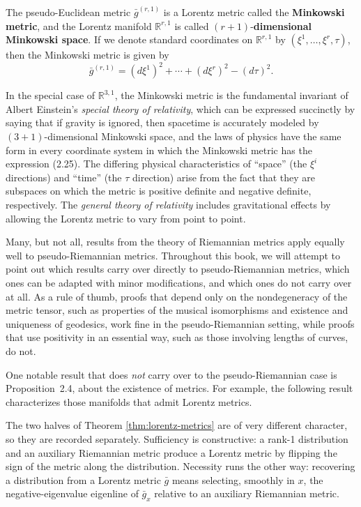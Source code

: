 The pseudo-Euclidean metric $\bar{g}^{(r,1)}$ is a Lorentz metric called the \textbf{Minkowski metric}, and the Lorentz manifold $\mathbb{R}^{r,1}$ is called $(r+1)$-\textbf{dimensional Minkowski space}. If we denote standard coordinates on $\mathbb{R}^{r,1}$ by $(\xi^1, \ldots, \xi^r, \tau)$, then the Minkowski metric is given by
\begin{equation}
\bar{g}^{(r,1)} = (d\xi^1)^2 + \cdots + (d\xi^r)^2 - (d\tau)^2.
\tag{2.25}
\end{equation}

In the special case of $\mathbb{R}^{3,1}$, the Minkowski metric is the fundamental invariant of Albert Einstein's \textit{special theory of relativity}, which can be expressed succinctly by saying that if gravity is ignored, then spacetime is accurately modeled by $(3+1)$-dimensional Minkowski space, and the laws of physics have the same form in every coordinate system in which the Minkowski metric has the expression (2.25). The differing physical characteristics of ``space'' (the $\xi^i$ directions) and ``time'' (the $\tau$ direction) arise from the fact that they are subspaces on which the metric is positive definite and negative definite, respectively. The \textit{general theory of relativity} includes gravitational effects by allowing the Lorentz metric to vary from point to point.

Many, but not all, results from the theory of Riemannian metrics apply equally well to pseudo-Riemannian metrics. Throughout this book, we will attempt to point out which results carry over directly to pseudo-Riemannian metrics, which ones can be adapted with minor modifications, and which ones do not carry over at all. As a rule of thumb, proofs that depend only on the nondegeneracy of the metric tensor, such as properties of the musical isomorphisms and existence and uniqueness of geodesics, work fine in the pseudo-Riemannian setting, while proofs that use positivity in an essential way, such as those involving lengths of curves, do not.

One notable result that does \emph{not} carry over to the pseudo-Riemannian case is Proposition~2.4, about the existence of metrics. For example, the following result characterizes those manifolds that admit Lorentz metrics.

The two halves of Theorem \ref{thm:lorentz-metrics} are of very different character, so they are recorded separately. Sufficiency is constructive: a rank-1 distribution and an auxiliary Riemannian metric produce a Lorentz metric by flipping the sign of the metric along the distribution. Necessity runs the other way: recovering a distribution from a Lorentz metric $\bar g$ means selecting, smoothly in $x$, the negative-eigenvalue eigenline of $\bar g_x$ relative to an auxiliary Riemannian metric.

